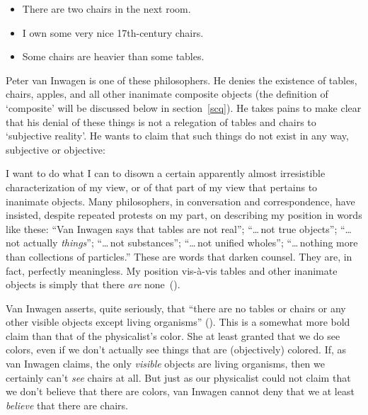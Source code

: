 \documentclass[11pt]{standalone}
\newenvironment{squote}{%
	\begin{spacing}{1}
	\begin{list}{}{%
	\setlength{\labelwidth}{0pt}%
	\rightmargin\leftmargin%
	}
	\item\relax
	}{%
	\end{list}%
	\end{spacing}
	}
\begin{document}
\begin{spacing}{1.5}
\begin{itemize}
  \item There are two chairs in the next room.
  \item I own some very nice 17th-century chairs.
  \item Some chairs are heavier than some tables.
\end{itemize}

Peter van Inwagen is one of these philosophers.  He denies the
existence of tables, chairs, apples, and all other inanimate composite
objects (the definition of `composite' will be discussed below in
section~\ref{scq}).  He takes pains to make clear that his denial of
these things is not a relegation of tables and chairs to `subjective
reality'.  He wants to claim that such things do not exist in any way,
subjective or objective:
\begin{squote}
I want to do what I can to disown a certain apparently almost
irresistible characterization of my view, or of that part of my view
that pertains to inanimate objects.  Many philosophers, in
conversation and correspondence, have insisted, despite repeated
protests on my part, on describing my position in words like these:
``Van Inwagen says that tables are not real''; ``\ldots\,not true
objects''; ``\ldots\,not actually {\em things}''; ``\ldots\,not
substances''; ``\ldots\,not unified wholes''; ``\ldots\,nothing more
than collections of particles.''  These are words that darken counsel.
They are, in fact, perfectly meaningless.  My position vis-\`{a}-vis
tables and other inanimate objects is simply that there {\em are}
none~(\citeyear[99]{inwagen1995}).
\end{squote}

Van Inwagen asserts, quite seriously, that ``there are no tables or
chairs or any other visible objects except living organisms''
(\citeyear[1]{inwagen1995}).  This is a somewhat more bold claim than
that of the physicalist's color.  She at least granted that we do see
colors, even if we don't actually see things that are (objectively)
colored.  If, as van Inwagen claims, the only {\em visible} objects
are living organisms, then we certainly can't {\em see} chairs at all.
But just as our physicalist could not claim that we don't believe that
there are colors, van Inwagen cannot deny that we at least {\em
  believe} that there are chairs.


\end{spacing}
\end{document}
